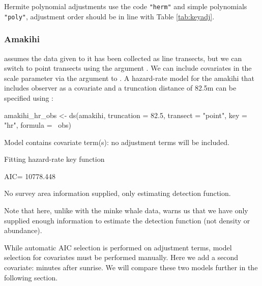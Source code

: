 \documentclass[article]{jss}
\begin{document}
Hermite polynomial adjustments use the code \texttt{"herm"} and simple
polynomials \texttt{"poly"}, adjustment order should be in line with
Table \ref{tab:keyadj}.

\subsubsection{Amakihi}\label{amakihi-1}

 assumes the data given to it has been collected as line
transects, but we can switch to point transects using the argument
. We can include covariates in the scale
parameter via the  argument to . A
hazard-rate model for the amakihi that includes observer as a covariate
and a truncation distance of 82.5m \citep{Marques:2007ey} can be
specified using :

\begin{CodeChunk}
\begin{CodeInput}
amakihi_hr_obs <- ds(amakihi, truncation = 82.5, transect = "point",
                     key = "hr", formula = ~obs)
\end{CodeInput}
\begin{CodeOutput}
Model contains covariate term(s): no adjustment terms will be included.
\end{CodeOutput}
\begin{CodeOutput}
Fitting hazard-rate key function
\end{CodeOutput}
\begin{CodeOutput}
AIC= 10778.448
\end{CodeOutput}
\begin{CodeOutput}
No survey area information supplied, only estimating detection function.
\end{CodeOutput}
\end{CodeChunk}

Note that here, unlike with the minke whale data,  warns us
that we have only supplied enough information to estimate the detection
function (not density or abundance).

While automatic AIC selection is performed on adjustment terms, model
selection for covariates must be performed manually. Here we add a
second covariate: minutes after sunrise. We will compare these two
models further in the following section.
\end{document}
